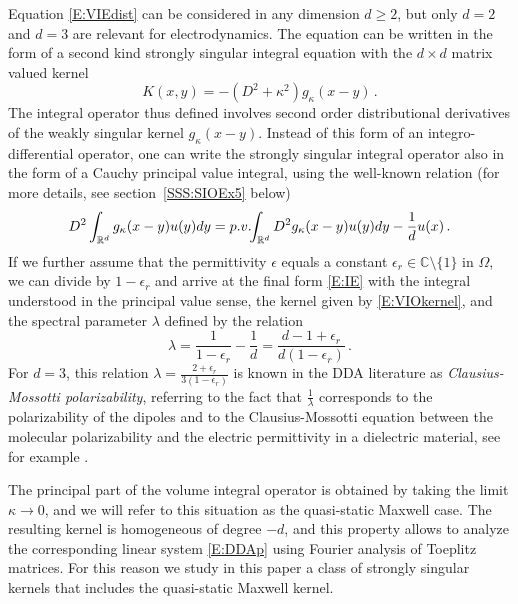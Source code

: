 \documentclass[12pt]{amsart}
\theoremstyle{definition}
\theoremstyle{remark}
\numberwithin{equation}{section}
\newcommand{\pv}{\mathop{\rm p.v.}}
\newcommand\C{{\mathbb C}}
\newcommand\R{{\mathbb R}}
\begin{document}
Equation \eqref{E:VIEdist}  can be considered in any dimension $d\ge2$, but only $d=2$ and $d=3$ are relevant for electrodynamics. The equation can be written in the form  of a second kind strongly singular integral equation with the $d\times d$ matrix valued kernel
\begin{equation}
\label{E:VIOkernel}
 K(x,y) = -(D^{2}+\kappa^{2})g_{\kappa}(x-y)\,.
\end{equation}
The integral operator thus defined involves second order distributional derivatives of the weakly singular kernel $g_{\kappa}(x-y)$. Instead of this form of an integro-differential operator, one can write the strongly singular integral operator also in the form of a Cauchy principal value integral, using the well-known relation (for more details, see section~\ref{SSS:SIOEx5} below)
\begin{equation}
\label{E:D2g-pv}
  D^{2}\int_{\R^{d}}g_{\kappa}(x-y)u(y)dy = 
  \pv\!\!\int_{\R^{d}} D^{2}g_{\kappa}(x-y)u(y)dy  - \frac1d u(x)\,.
\end{equation}
If we further assume that the permittivity $\epsilon$ equals a constant $\epsilon_{r}\in\C\setminus\{1\}$ in $\Omega$, we can divide by $1-\epsilon_{r}$ and arrive at the final form \eqref{E:IE} with the integral understood in the principal value sense, the kernel given by \eqref{E:VIOkernel}, and the spectral parameter $\lambda$ defined by the relation
\begin{equation}
\label{E:ClauMoss}
 \lambda = \frac1{1-\epsilon_{r}} - \frac1d = \frac{d-1+\epsilon_{r}}{d(1-\epsilon_{r})}\,.
\end{equation}
For $d=3$, this relation $\lambda=\frac{2+\epsilon_{r}}{3(1-\epsilon_{r})}$ is known in the DDA literature as \emph{Clausius-Mossotti polarizability}, referring to the fact that $\frac1\lambda$ corresponds to the polarizability of the dipoles and to the Clausius-Mossotti equation between the molecular polarizability and the electric permittivity in a dielectric material, see for example \cite[Section 4.5]{Jackson1999}. 

The principal part of the volume integral operator is obtained by taking the limit $\kappa\to0$, and we will refer to this situation as the quasi-static Maxwell case. 
The resulting kernel is homogeneous of degree $-d$, and this property allows to analyze the corresponding linear system \eqref{E:DDAp} using Fourier analysis of Toeplitz matrices. For this reason we study in this paper a class of strongly singular kernels that includes the quasi-static Maxwell kernel.
\end{document}
